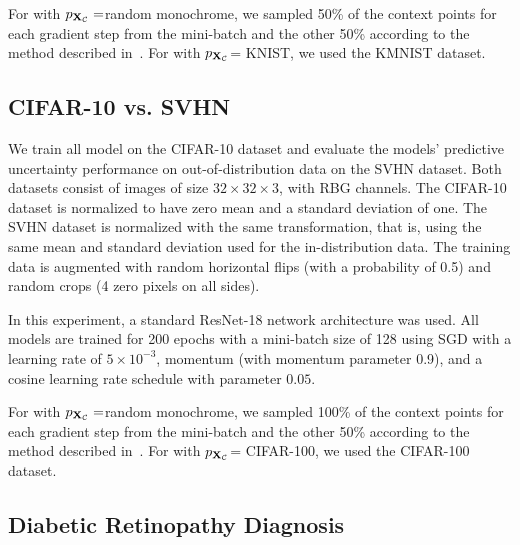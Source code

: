 \begin{appendices}
For \fsvi with $p_{\mathbf X_{\mathcal{C}}}=$random monochrome, we sampled 50\% of the context points for each gradient step from the mini-batch and the other 50\% according to the method described in~.
For \fsvi with $p_{\mathbf X_{\mathcal{C}}}$= KNIST, we used the KMNIST dataset.



\subsection{CIFAR-10 vs. SVHN}

We train all model on the CIFAR-10 dataset and evaluate the models' predictive uncertainty performance on out-of-distribution data on the SVHN dataset.
Both datasets consist of images of size $32 \times 32 \times 3$, with RBG channels.
The CIFAR-10 dataset is normalized to have zero mean and a standard deviation of one.
The SVHN dataset is normalized with the same transformation, that is, using the same mean and standard deviation used for the in-distribution data.
The training data is augmented with random horizontal flips (with a probability of 0.5) and random crops (4 zero pixels on all sides). 

In this experiment, a standard ResNet-18 network architecture was used.
All models are trained for 200 epochs with a mini-batch size of 128 using SGD with a learning rate of $5 \times 10^{-3}$, momentum (with momentum parameter 0.9), and a cosine learning rate schedule with parameter $0.05$.

For \fsvi with $p_{\mathbf X_{\mathcal{C}}}=$random monochrome, we sampled 100\% of the context points for each gradient step from the mini-batch and the other 50\% according to the method described in~.
For \fsvi with $p_{\mathbf X_{\mathcal{C}}}$= CIFAR-100, we used the CIFAR-100 dataset.


\subsection{Diabetic Retinopathy Diagnosis}
\label{appsec:retina}


\end{appendices}
